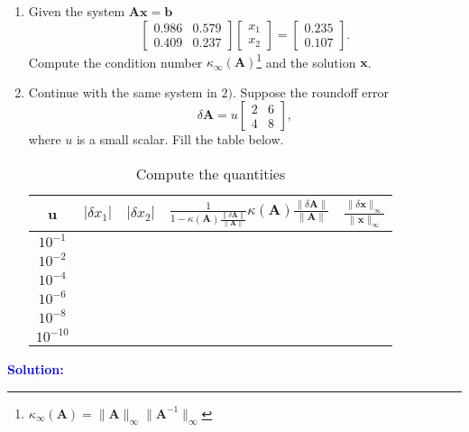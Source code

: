 \documentclass[english,onecolumn]{IEEEtran}
\begin{document}
\begin{enumerate}
    \item Given the system $\mathbf{A}\mathbf{x} = \mathbf{b}$
    \[
        \begin{bmatrix}0.986 & 0.579 \\ 0.409 & 0.237\end{bmatrix} \begin{bmatrix}x_1 \\ x_2 \end{bmatrix} = 
        \begin{bmatrix}0.235 \\ 0.107 \end{bmatrix}.
    \]
    Compute the condition number $\kappa_\infty(\mathbf{A})$\footnote{$\kappa_\infty(\mathbf{A}) = \|\mathbf{A}\|_\infty\|\mathbf{A}^{-1}\|_\infty$} and the solution $\mathbf{x}$.
    \item Continue with the same system in $2)$. Suppose the roundoff error
    \[
    \delta \mathbf{A} = u\begin{bmatrix}2 & 6 \\ 4 & 8\end{bmatrix},
    \]
    where $u$ is a small scalar. Fill the table below.
    \begin{table}[]
        \centering
        \caption{Compute the quantities}
        \begin{tabular}{c|c|c|c|c}
        \hline
            u & $|\delta x_1|$ & $|\delta x_2|$ & $\frac{1}{1-\kappa(\mathbf{A})\frac{\|\delta \mathbf{A}\|}{\|\mathbf{A}\|}}\kappa(\mathbf{A})\frac{\|\delta \mathbf{A}\|}{\|\mathbf{A}\|}$ & $\frac{\|\delta \textbf{x}\|_\infty}{\|\textbf{x}\|_\infty}$\\
            \hline
            $10^{-1}$ & & & \\
            $10^{-2}$ & & & \\
            $10^{-4}$ & & & \\
            $10^{-6}$ & & & \\
            $10^{-8}$ & & & \\
            $10^{-10}$ & & & \\
            \hline
        \end{tabular}
        \label{tab:my_label}
    \end{table}
    
\end{enumerate}

\noindent\textcolor{blue}{\textbf{Solution:}
}


\newpage
\end{document}

